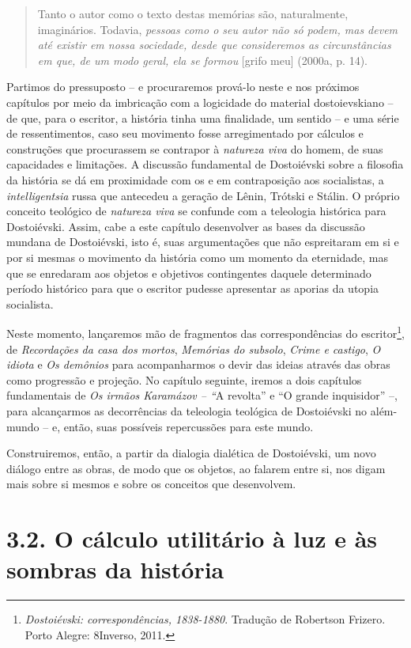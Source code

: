 \begin{quote}
Tanto o autor como o texto destas memórias são, naturalmente,
imaginários. Todavia, \emph{pessoas como o seu autor não só podem, mas
devem até existir em nossa sociedade, desde que consideremos as
circunstâncias em que, de um modo geral, ela se formou} {[}grifo meu{]}
(2000a, p. 14).
\end{quote}

Partimos do pressuposto -- e procuraremos prová-lo neste e nos próximos
capítulos por meio da imbricação com a logicidade do material
dostoievskiano -- de que, para o escritor, a história tinha uma
finalidade, um sentido -- e uma série de ressentimentos, caso seu
movimento fosse arregimentado por cálculos e construções que procurassem
se contrapor à \emph{natureza viva} do homem, de suas capacidades e
limitações. A discussão fundamental de Dostoiévski sobre a filosofia da
história se dá em proximidade com os e em contraposição aos socialistas,
a \emph{intelligentsia} russa que antecedeu a geração de Lênin, Trótski
e Stálin. O próprio conceito teológico de \emph{natureza viva} se
confunde com a teleologia histórica para Dostoiévski. Assim, cabe a este
capítulo desenvolver as bases da discussão mundana de Dostoiévski, isto
é, suas argumentações que não espreitaram em si e por si mesmas o
movimento da história como um momento da eternidade, mas que se
enredaram aos objetos e objetivos contingentes daquele determinado
período histórico para que o escritor pudesse apresentar as aporias da
utopia socialista.

Neste momento, lançaremos mão de fragmentos das correspondências do
escritor\footnote{\emph{Dostoiévski: correspondências, 1838-1880}.
  Tradução de Robertson Frizero. Porto Alegre: 8Inverso, 2011.}, de
\emph{Recordações da casa dos mortos}, \emph{Memórias do subsolo},
\emph{Crime e castigo}, \emph{O idiota} e \emph{Os demônios} para
acompanharmos o devir das ideias através das obras como progressão e
projeção. No capítulo seguinte, iremos a dois capítulos fundamentais de
\emph{Os irmãos Karamázov -- ``}A revolta'' e ``O grande inquisidor''
--, para alcançarmos as decorrências da teleologia teológica de
Dostoiévski no além-mundo -- e, então, suas possíveis repercussões para
este mundo.

Construiremos, então, a partir da dialogia dialética de Dostoiévski, um
novo diálogo entre as obras, de modo que os objetos, ao falarem entre
si, nos digam mais sobre si mesmos e sobre os conceitos que desenvolvem.

\section{3.2. O cálculo utilitário à luz e às sombras da história}

